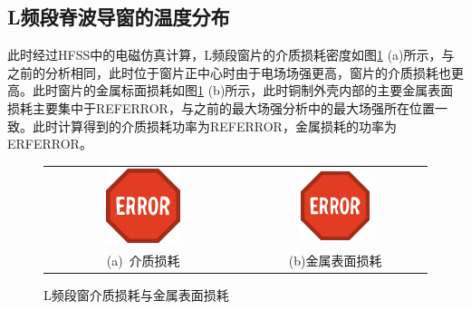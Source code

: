 \documentclass[master]{thesis-uestc}
\begin{document}
\subsection{L频段脊波导窗的温度分布}
此时经过HFSS中的电磁仿真计算，L频段窗片的介质损耗密度如图\ref{fig:L体损耗与面损耗} (a)所示，与之前的分析相同，此时位于窗片正中心时由于电场场强更高，窗片的介质损耗也更高。此时窗片的金属标面损耗如图\ref{fig:L体损耗与面损耗} (b)所示，此时铜制外壳内部的主要金属表面损耗主要集中于REFERROR，与之前的最大场强分析中的最大场强所在位置一致。此时计算得到的介质损耗功率为REFERROR，金属损耗的功率为ERFERROR。
\begin{figure}[!htb]
    \small
    \centering
    \begin{tabular}{@{\ }c@{\ }c}
        \includegraphics[width=0.4\textwidth]{pic/ERROR.jpg} & 
        \hspace{5pt}
        \includegraphics[width=0.4\textwidth]{pic/ERROR.jpg}     \\
        \mbox{\small (a) 介质损耗}                                                                               & 
        \mbox{\small (b)金属表面损耗}                                                                                  \\
    \end{tabular}
    \caption{L频段窗介质损耗与金属表面损耗}
    \label{fig:L体损耗与面损耗}
\end{figure}
\end{document}
